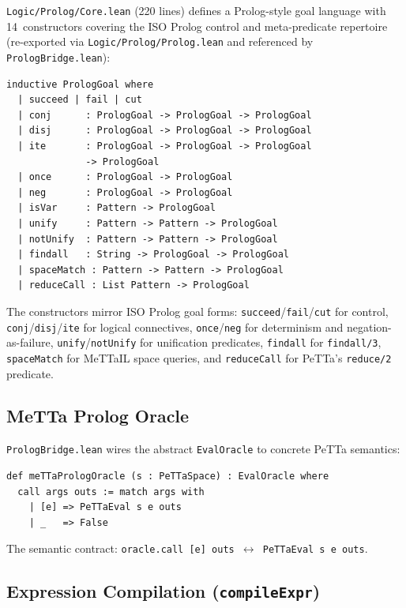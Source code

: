 \documentclass[]{article}
\newcommand{\code}[1]{\texttt{#1}}
\newcommand{\PeTTa}{\textup{PeTTa}}
\newcommand{\MeTTaIL}{\textup{MeTTaIL}}
\begin{document}
\code{Logic/Prolog/Core.lean} (220 lines) defines a Prolog-style goal language
with 14~constructors covering the ISO Prolog control and meta-predicate
repertoire (re-exported via \code{Logic/Prolog/Prolog.lean} and referenced by
\code{PrologBridge.lean}):

\begin{lstlisting}[language=lean]
inductive PrologGoal where
  | succeed | fail | cut
  | conj      : PrologGoal -> PrologGoal -> PrologGoal
  | disj      : PrologGoal -> PrologGoal -> PrologGoal
  | ite       : PrologGoal -> PrologGoal -> PrologGoal
              -> PrologGoal
  | once      : PrologGoal -> PrologGoal
  | neg       : PrologGoal -> PrologGoal
  | isVar     : Pattern -> PrologGoal
  | unify     : Pattern -> Pattern -> PrologGoal
  | notUnify  : Pattern -> Pattern -> PrologGoal
  | findall   : String -> PrologGoal -> PrologGoal
  | spaceMatch : Pattern -> Pattern -> PrologGoal
  | reduceCall : List Pattern -> PrologGoal
\end{lstlisting}

\noindent
The constructors mirror ISO Prolog goal forms:
\code{succeed}/\code{fail}/\code{cut} for control,
\code{conj}/\code{disj}/\code{ite} for logical connectives,
\code{once}/\code{neg} for determinism and negation-as-failure,
\code{unify}/\code{notUnify} for unification predicates,
\code{findall} for \code{findall/3},
\code{spaceMatch} for \MeTTaIL{} space queries, and
\code{reduceCall} for \PeTTa{}'s \code{reduce/2} predicate.

\subsection{MeTTa Prolog Oracle}

\code{PrologBridge.lean} wires the abstract \code{EvalOracle} to
concrete \PeTTa{} semantics:

\begin{lstlisting}[language=lean]
def meTTaPrologOracle (s : PeTTaSpace) : EvalOracle where
  call args outs := match args with
    | [e] => PeTTaEval s e outs
    | _   => False
\end{lstlisting}

The semantic contract: \code{oracle.call [e] outs $\leftrightarrow$
PeTTaEval s e outs}.

\subsection{Expression Compilation (\code{compileExpr})}
\end{document}

